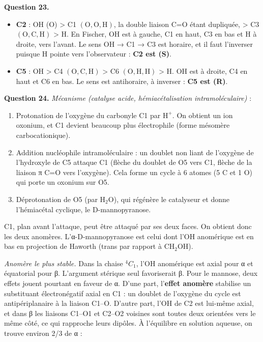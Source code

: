 \documentclass[11pt,a4paper]{article}
\providecommand{\tightlist}{\setlength{\itemsep}{0pt}\setlength{\parskip}{0pt}}
\newcommand{\equationajustee}[1]{%
  \sbox{\boiteequation}{$\displaystyle #1$}%
  \ifdim\wd\boiteequation>\linewidth
    \[\resizebox{\linewidth}{!}{\usebox{\boiteequation}}\]%
  \else
    \[#1\]%
  \fi}
\begin{document}
\textbf{Question 23.}

\begin{itemize}
\tightlist
\item
  \textbf{C2} : \(\mathrm{OH}\) (O) \textgreater{} C1 \((\mathrm{O,O,H})\), la double liaison C=O étant dupliquée, \textgreater{} C3 \((\mathrm{O,C,H})\) \textgreater{} H. En Fischer, OH est à gauche, C1 en haut, C3 en bas et H à droite, vers l'avant. Le sens OH → C1 → C3 est horaire, et il faut l'inverser puisque H pointe vers l'observateur : \textbf{C2 est (S)}.
\item
  \textbf{C5} : \(\mathrm{OH}\) \textgreater{} C4 \((\mathrm{O,C,H})\) \textgreater{} C6 \((\mathrm{O,H,H})\) \textgreater{} H. OH est à droite, C4 en haut et C6 en bas. Le sens est antihoraire, à inverser : \textbf{C5 est (R)}.
\end{itemize}

\equationajustee{\boxed{\mathrm{C2}:(S)\qquad \mathrm{C5}:(R)}\qquad(\text{D-mannose} = (2S,3S,4R,5R))}

\textbf{Question 24.} \emph{Mécanisme (catalyse acide, hémiacétalisation intramoléculaire)} :

\begin{enumerate}
\def\labelenumi{\arabic{enumi}.}
\tightlist
\item
  Protonation de l'oxygène du carbonyle C1 par \(\mathrm{H^+}\). On obtient un ion oxonium, et C1 devient beaucoup plus électrophile (forme mésomère carbocationique).
\item
  Addition nucléophile intramoléculaire : un doublet non liant de l'oxygène de l'hydroxyle de C5 attaque C1 (flèche du doublet de O5 vers C1, flèche de la liaison π C=O vers l'oxygène). Cela forme un cycle à 6 atomes (5 C et 1 O) qui porte un oxonium sur O5.
\item
  Déprotonation de O5 (par \(\mathrm{H_2O}\)), qui régénère le catalyseur et donne l'hémiacétal cyclique, le D-mannopyranose.
\end{enumerate}

C1, plan avant l'attaque, peut être attaqué par ses deux faces. On obtient donc les deux anomères. L'α-D-mannopyranose est celui dont l'OH anomérique est en bas en projection de Haworth (trans par rapport à \(\mathrm{CH_2OH}\)).

\emph{Anomère le plus stable.} Dans la chaise \({}^4C_1\), l'OH anomérique est axial pour α et équatorial pour β. L'argument stérique seul favoriserait β. Pour le mannose, deux effets jouent pourtant en faveur de α. D'une part, l'\textbf{effet anomère} stabilise un substituant électronégatif axial en C1 : un doublet de l'oxygène du cycle est antipériplanaire à la liaison C1--O. D'autre part, l'OH de C2 est lui-même axial, et dans β les liaisons C1--O1 et C2--O2 voisines sont toutes deux orientées vers le même côté, ce qui rapproche leurs dipôles. À l'équilibre en solution aqueuse, on trouve environ 2/3 de α :
\end{document}
